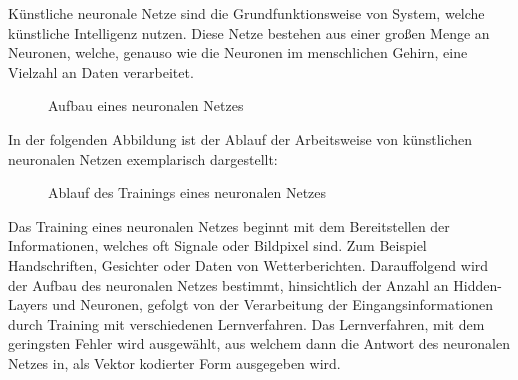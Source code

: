 Künstliche neuronale Netze sind die Grundfunktionsweise von System, welche
künstliche Intelligenz nutzen. Diese Netze bestehen aus einer großen Menge an
Neuronen, welche, genauso wie die Neuronen im menschlichen Gehirn, eine
Vielzahl an Daten verarbeitet. 
\begin{figure}[h]
    \centering
    
    \caption[width=0.4\textwidth]{Aufbau eines neuronalen Netzes}
    \label{fig:trainingneuronalesnetz}
\end{figure}
In der folgenden Abbildung ist der Ablauf der
Arbeitsweise von künstlichen neuronalen Netzen exemplarisch dargestellt:
\begin{figure}[h]
    \centering
    
    \caption[width=0.4\textwidth]{Ablauf des Trainings eines neuronalen Netzes}
    \label{fig:trainingneuronalesnetz}
\end{figure}
Das Training eines neuronalen Netzes beginnt mit dem Bereitstellen der
Informationen, welches oft Signale oder Bildpixel sind. Zum Beispiel
Handschriften, Gesichter oder Daten von Wetterberichten. Darauffolgend wird der
Aufbau des neuronalen Netzes bestimmt, hinsichtlich der Anzahl an Hidden-Layers
und Neuronen, gefolgt von der Verarbeitung der Eingangsinformationen durch
Training mit verschiedenen Lernverfahren. Das Lernverfahren, mit dem geringsten
Fehler wird ausgewählt, aus welchem dann die Antwort des neuronalen Netzes in,
als Vektor kodierter Form ausgegeben wird.\cite{dorn2016programmieren}